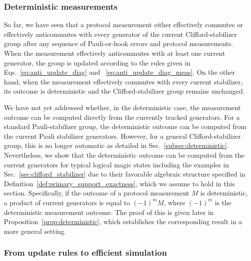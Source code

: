 \documentclass[
 reprint,
 amsmath,amssymb,
 pra,superscriptaddress, nofootinbib
]{revtex4-2}
\theoremstyle{definition}
\theoremstyle{plain}
\begin{document}
\subsubsection{Deterministic measurements}

So far, we have seen that a protocol measurement either effectively commutes or effectively anticommutes with every generator of the current Clifford-stabilizer group after any sequence of Pauli-or-hook errors and protocol measurements. 
When the measurement effectively anticommutes with at least one current generator, the group is updated according to the rules given in Eqs.~\eqref{eq:anti_update_diag} and ~\eqref{eq:anti_update_diag_meas}. On the other hand, when the measurement effectively commutes with every current stabilizer, its outcome is deterministic and the Clifford-stabilizer group remains unchanged.

We have not yet addressed whether, in the deterministic case, the measurement outcome can be computed directly from the currently tracked generators.
For a standard Pauli-stabilizer group, the deterministic outcome can be computed from the current Pauli stabilizer generators. 
However, for a general Clifford-stabilizer group, this is no longer automatic as detailed in Sec.~\ref{subsec:deterministic}.
Nevertheless, we show that the deterministic outcome can be computed from the current generators for typical logical magic states including the examples in Sec.~\ref{sec:clifford_stabilizer} due to their favorable algebraic structure specified in Definition~\ref{def:primary_support_exactness}, which we assume to hold in this section.
Specifically, if the outcome of a protocol measurement $M$ is deterministic, a product of current generators is equal to $(-1)^m M$, where $(-1)^m$ is the deterministic measurement outcome.
The proof of this is given later in Proposition~\ref{prop:deterministic}, which establishes the corresponding result in a more general setting.

\subsubsection{From update rules to efficient simulation}
\end{document}

